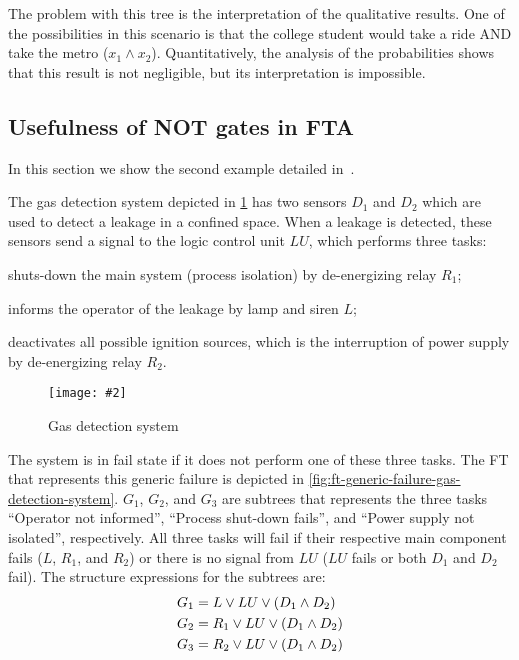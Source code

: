 \documentclass[12pt,openright,twoside,a4paper,oldfontcommands,english,brazil,final]{abntex2}
\theoremstyle{theo}
\newcommand{\includegraphicsaspectratio}[2][1]{%
  \texttt{[image: \#2]}%
}
\newcommand{\parsin}[1]{\ensuremath\left( #1 \right)}
\begin{document}
The problem with this tree is the interpretation of the qualitative results.
One of the possibilities in this scenario is that the college student would take a ride \ac{AND} take the metro ($x_1 \land x_2$).
Quantitatively, the analysis of the probabilities shows that this result is not negligible, but its interpretation is impossible.

\subsection[Usefulness of NOT gates in FTA]{Usefulness of \ac{NOT} gates in \ac{FTA}}
\label{sec:non-coherent-usefulness}

In this section we show the second example detailed in~\cite{Andrews2001}.

The gas detection system depicted in \cref{fig:gas-detection-system} has two sensors $D_1$ and $D_2$ which are used to detect a leakage in a confined space.
When a leakage is detected, these sensors send a signal to the logic control unit $LU$, which performs three tasks:
%
\begin{alineas}
  \item shuts-down the main system (process isolation) by de-energizing relay $R_1$;
  \item informs the operator of the leakage by lamp and siren $L$;
  \item deactivates all possible ignition sources, which is the interruption of power supply by de-energizing relay $R_2$.
\end{alineas}

\begin{figure}[htb]
  \centering
  \includegraphicsaspectratio[0.45]{gas-detection-system}
  \caption{Gas detection system}
  \label{fig:gas-detection-system}
\end{figure}

The system is in fail state if it does not perform one of these three tasks.
The \acl{FT} that represents this generic failure is depicted in \cref{fig:ft-generic-failure-gas-detection-system}.
$G_1$, $G_2$, and $G_3$ are subtrees that represents the three tasks ``Operator not informed'', ``Process shut-down fails'', and ``Power supply not isolated'', respectively.
All three tasks will fail if their respective main component fails ($L$, $R_1$, and $R_2$) or there is no signal from $LU$ ($LU$ fails or both $D_1$ and $D_2$ fail).
The structure expressions for the subtrees are:
%
\begin{align*}
  G_1 & = L \lor LU \lor \parsin{D_1 \land D_2}\\
  G_2 & = R_1 \lor LU \lor \parsin{D_1 \land D_2}\\
  G_3 & = R_2 \lor LU \lor \parsin{D_1 \land D_2}
\end{align*}
\end{document}
